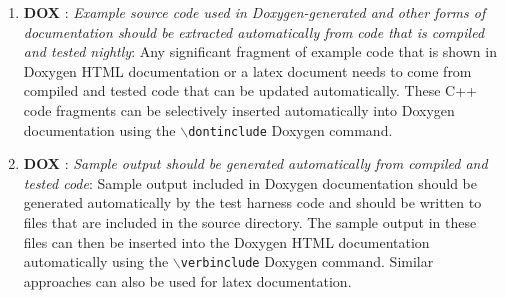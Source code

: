 \begin{enumerate}
{\small\begin{verbatim}

  class SomeClass : public Teuchos::ParameterListAcceptor {
  public:

    ...

    /** \name Overriden from Teuchos::ParameterListAccpetor */
    //@{

    /** \brief . */
    void setParameterList(
      Teuchos::RefCountPtr<Teuchos::ParameterList> const& paramList);
    /** \brief . */
    Teuchos::RefCountPtr<Teuchos::ParameterList> getParameterList();
    /** \brief . */
    Teuchos::RefCountPtr<Teuchos::ParameterList> unsetParameterList();
    /** \brief . */
    Teuchos::RefCountPtr<const Teuchos::ParameterList> getParameterList() const;
    /** \brief . */
    Teuchos::RefCountPtr<const Teuchos::ParameterList> getValidParameters() const;

    //@}

    ...

  };

\end{verbatim}}

{}\item{}\textbf{DOX }:
{}\textit{Example source code used in Doxygen-generated and other forms
of documentation should be extracted automatically from code that is compiled
and tested nightly}: Any significant fragment of example code that is shown in
Doxygen HTML documentation or a latex document needs to come from compiled and
tested code that can be updated automatically.  These C++ code fragments can
be selectively inserted automatically into Doxygen documentation using the
{}\texttt{$\backslash$dontinclude} Doxygen command.

{}\item{}\textbf{DOX }:
{}\textit{Sample output should be generated automatically from compiled
and tested code}: Sample output included in Doxygen documentation should be
generated automatically by the test harness code and should be written to
files that are included in the source directory.  The sample output in these
files can then be inserted into the Doxygen HTML documentation automatically
using the {}\texttt{$\backslash$verbinclude} Doxygen command.  Similar
approaches can also be used for latex documentation.

\end{enumerate}
